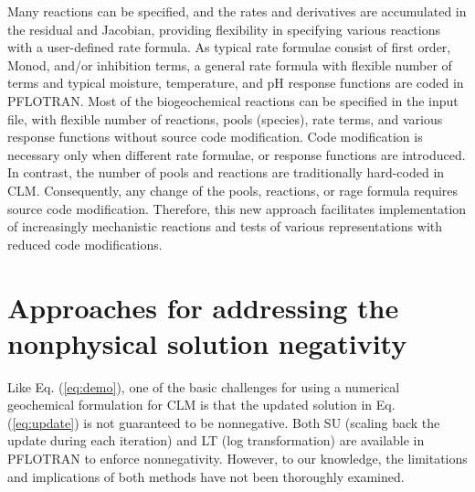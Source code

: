 \documentclass[gmd, manuscript]{copernicus}
\begin{document}
Many reactions can be
specified, and the rates and derivatives are accumulated in the residual and
Jacobian, providing flexibility in specifying various reactions with
a user-defined rate formula. As typical rate formulae consist of first order,
Monod, and/or inhibition terms, a general rate formula with flexible
number of terms and typical moisture, temperature, and pH response functions
are coded in PFLOTRAN. Most of the biogeochemical reactions can be specified in
the input file, with flexible number of reactions, pools (species), rate terms,
and various response functions without source code modification. Code
modification is necessary only when different rate formulae, or response
functions are introduced.
In contrast, the number of pools and reactions
are traditionally hard-coded in CLM. Consequently, any change of the pools,
reactions, or rage formula requires source code modification. Therefore, this
new approach facilitates implementation of increasingly mechanistic reactions
and tests of various representations with reduced code modifications.


%

\section{Approaches for addressing the nonphysical solution negativity}
Like Eq. (\ref{eq:demo}), one of the basic challenges for using a numerical geochemical formulation
for CLM is that the updated solution in Eq. (\ref{eq:update}) is not guaranteed to be nonnegative. 
Both SU (scaling back the update during each iteration) and LT (log
transformation) are available in PFLOTRAN  to enforce nonnegativity. 
However, to our knowledge, the limitations and implications of both methods have
not been thoroughly examined.  
\end{document}
